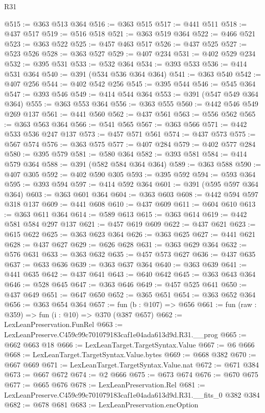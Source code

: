 \begin{lexlean}{R31}
\begin{coremodule}
@515 := @363 @513 @364
@516 := @363 @515
@517 := @441 @511
@518 := @437 @517
@519 := @516 @518
@521 := @363 @519 @364
@522 := @466 @521
@523 := @363 @522
@525 := @457 @463 @517
@526 := @437 @525
@527 := @523 @526
@528 := @363 @527
@529 := @407 @234
@531 := @402 @529 @234
@532 := @395 @531
@533 := @532 @364
@534 := @393 @533
@536 := @414 @531 @364
@540 := @391 (@534 @536 @364 @364)
@541 := @363 @540
@542 := @407 @256
@544 := @402 @542 @256
@545 := @395 @544
@546 := @545 @364
@547 := @393 @546
@549 := @414 @544 @364
@553 := @391 (@547 @549 @364 @364)
@555 := @363 @553 @364
@556 := @363 @555
@560 := @442 @546 @549 @269 @137
@561 := @441 @560
@562 := @437 @561
@563 := @556 @562
@565 := @363 @563 @364
@566 := @541 @565
@567 := @363 @566
@571 := @442 @533 @536 @247 @137
@573 := @457 @571 @561
@574 := @437 @573
@575 := @567 @574
@576 := @363 @575
@577 := @407 @284
@579 := @402 @577 @284
@580 := @395 @579
@581 := @580 @364
@582 := @393 @581
@584 := @414 @579 @364
@588 := @391 (@582 @584 @364 @364)
@589 := @363 @588
@590 := @407 @305
@592 := @402 @590 @305
@593 := @395 @592
@594 := @593 @364
@595 := @393 @594
@597 := @414 @592 @364
@601 := @391 (@595 @597 @364 @364)
@603 := @363 @601 @364
@604 := @363 @603
@608 := @442 @594 @597 @318 @137
@609 := @441 @608
@610 := @437 @609
@611 := @604 @610
@613 := @363 @611 @364
@614 := @589 @613
@615 := @363 @614
@619 := @442 @581 @584 @297 @137
@621 := @457 @619 @609
@622 := @437 @621
@623 := @615 @622
@625 := @363 @623 @364
@626 := @363 @625
@627 := @441 @621
@628 := @437 @627
@629 := @626 @628
@631 := @363 @629 @364
@632 := @576 @631
@633 := @363 @632
@635 := @457 @573 @627
@636 := @437 @635
@637 := @633 @636
@639 := @363 @637 @364
@640 := @363 @639
@641 := @441 @635
@642 := @437 @641
@643 := @640 @642
@645 := @363 @643 @364
@646 := @528 @645
@647 := @363 @646
@649 := @457 @525 @641
@650 := @437 @649
@651 := @647 @650
@652 := @365 @651
@654 := @363 @652 @364
@656 := @363 @654 @364
@657 := fun (b : @107) => @656
@661 := fun (raw : @359) => fun (i : @10) => @370 (@387 @657)
@662 := LexLeanPreservation.FunRel
@663 := LexLeanPreserve.C459c99c701079183caf1e04ada613d9d.R31.__prog
@665 := @662 @663 @18
@666 := LexLeanTarget.TargetSyntax.Value
@667 := @6 @666
@668 := LexLeanTarget.TargetSyntax.Value.bytes
@669 := @668 @382
@670 := @667 @669
@671 := LexLeanTarget.TargetSyntax.Value.nat
@672 := @671 @384
@673 := @667 @672
@674 := @2 @666
@675 := @673 @674
@676 := @670 @675
@677 := @665 @676
@678 := LexLeanPreservation.Rel
@681 := LexLeanPreserve.C459c99c701079183caf1e04ada613d9d.R31.__fits_0 @382 @384
@682 := @678 @681
@683 := LexLeanPreservation.encOption

\end{coremodule}
\end{lexlean}
